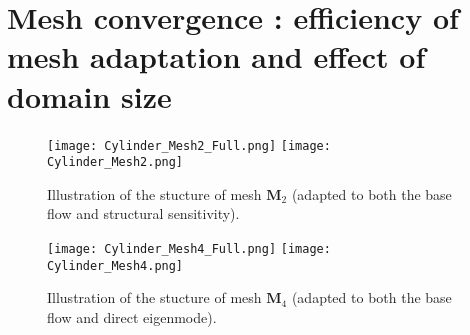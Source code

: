 \documentclass[twocolumn,10pt]{asme2ej}
\begin{document}


\appendix










\section{Mesh convergence : efficiency of mesh adaptation and effect of domain size}
\begin{figure}
\texttt{[image: Cylinder\_Mesh2\_Full.png]}
\texttt{[image: Cylinder\_Mesh2.png]}
\caption{Illustration of the stucture of mesh  $\mathbf{M}_2$ (adapted to both the base flow and structural sensitivity).}
\label{fig:mesh2}
\end{figure}

\begin{figure}
\texttt{[image: Cylinder\_Mesh4\_Full.png]}
\texttt{[image: Cylinder\_Mesh4.png]}
\caption{Illustration of the stucture of mesh  $\mathbf{M}_4$ (adapted to both the base flow and direct eigenmode).}
\label{fig:mesh4}
\end{figure}
\end{document}
